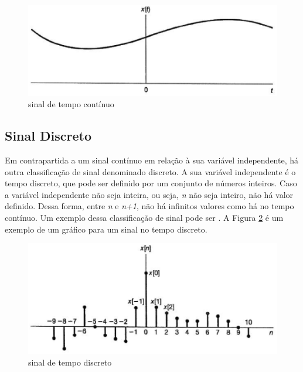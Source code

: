 \begin{figure}[h]
	\centering
	\includegraphics[scale=0.5]{figuras/fig01.eps}
	\caption{sinal de tempo contínuo \cite{oppenheim2010sinais}}
	\label{fig01}
\end{figure}
\newpage

\subsection{Sinal Discreto}
Em contrapartida a um sinal contínuo em relação à sua variável independente, há outra classificação de sinal denominado discreto. A sua variável independente é o tempo discreto, que pode ser definido por um conjunto de números inteiros. Caso a variável independente não seja inteira, ou seja, \textit{n} não seja inteiro, não há valor definido. Dessa forma, entre \textit{n} e \textit{n+1}, não há infinitos valores como há no tempo contínuo. Um exemplo dessa classificação de sinal pode ser \cite{oppenheim2010sinais}. A Figura \ref{fig02} é um exemplo de um gráfico para um sinal no tempo discreto.

\begin{figure}[h]
	\centering
    \includegraphics[scale=0.5]{figuras/fig02.eps}
	\caption{sinal de tempo discreto \cite{oppenheim2010sinais}}
	\label{fig02}
\end{figure}

